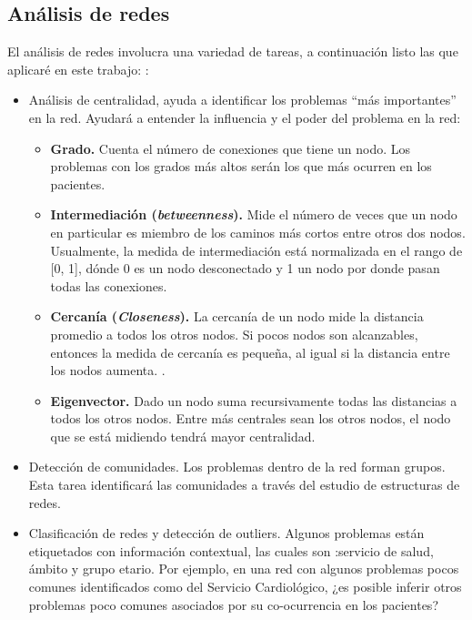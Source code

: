 \subsection{Análisis de redes}
El análisis de redes involucra una variedad de tareas, a continuación listo las que aplicaré en este trabajo: \cite{Tang2010}:
\begin{itemize}
  \item Análisis de centralidad, ayuda a identificar los problemas “más importantes” en la red. Ayudará a entender la influencia y el poder del problema en la red:
  
\begin{itemize}
\item \textbf{Grado.}
Cuenta el número de conexiones que tiene un nodo. Los problemas con los grados más altos serán los que más ocurren en los pacientes.
\item \textbf{Intermediación (\textit{betweenness}).} Mide el número de veces que un nodo en particular es miembro de los caminos más cortos entre otros dos nodos.
Usualmente, la medida de intermediación está normalizada en el rango de [0, 1], dónde 0 es un nodo desconectado y 1 un nodo por donde pasan todas las conexiones.\cite{Cook2006,Brath2015GraphData}
\item \textbf{Cercanía (\textit{Closeness}).} La cercanía de un nodo mide la distancia promedio a todos los otros nodos. Si pocos nodos son alcanzables, entonces la medida de cercanía es pequeña, al igual si la distancia entre los nodos aumenta. \cite{Cook2006,Brath2015GraphData}.
\item \textbf{Eigenvector.} Dado un nodo suma recursivamente todas las distancias a todos los otros nodos. Entre más centrales sean los otros nodos, el nodo que se está midiendo tendrá mayor centralidad\cite{Brath2015GraphData}.
\end{itemize}
  \item Detección de comunidades. Los problemas dentro de la red forman grupos. Esta tarea identificará las comunidades a través del estudio de estructuras de redes.
  \item Clasificación de redes y detección de outliers. Algunos problemas están etiquetados con información contextual, las cuales son :servicio de salud, ámbito y grupo etario. Por ejemplo, en una red con algunos problemas pocos comunes identificados como del Servicio Cardiológico, ¿es posible inferir otros problemas poco comunes asociados por su co-ocurrencia en los pacientes?
\end{itemize}

